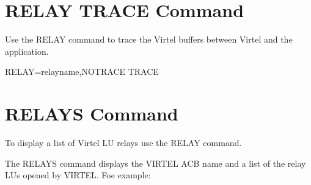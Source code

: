 \documentclass[letterpaper,10pt,english]{sphinxmanual}
\begin{document}
\ignorespaces 

\section{RELAY TRACE Command}
\label{\detokenize{audit_operations_ and_performance:relay-trace-command}}\label{\detokenize{audit_operations_ and_performance:index-16}}
Use the RELAY command to trace the Virtel buffers between Virtel and the application.

RELAY=relayname,NOTRACE \textbar{} TRACE

\ignorespaces 

\section{RELAYS Command}
\label{\detokenize{audit_operations_ and_performance:relays-command}}\label{\detokenize{audit_operations_ and_performance:index-17}}
To display a list of Virtel LU relays use the RELAY command.

\begin{sphinxVerbatim}[commandchars=\\\{\}]
\end{sphinxVerbatim}

The RELAYS command displays the VIRTEL ACB name and a list of the relay LUs opened by VIRTEL. Foe example:

\begin{sphinxVerbatim}[commandchars=\\\{\}]
 
 
       
         
    
     
  
   
\end{sphinxVerbatim}
\end{document}
